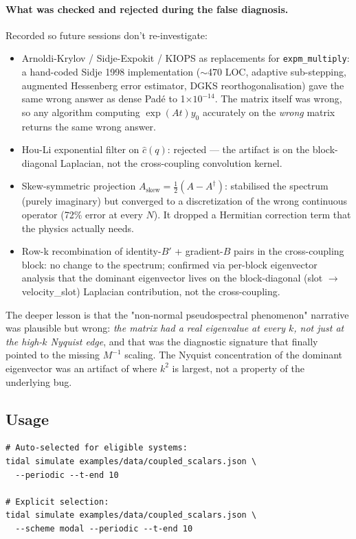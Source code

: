 \paragraph{What was checked and rejected during the false diagnosis.}
Recorded so future sessions don't re-investigate:
\begin{itemize}
  \item Arnoldi-Krylov / Sidje-Expokit / KIOPS as replacements for
    \texttt{expm\_multiply}: a hand-coded Sidje 1998 implementation
    ($\sim$470 LOC, adaptive sub-stepping, augmented Hessenberg error
    estimator, DGKS reorthogonalisation) gave the same wrong answer as
    dense Padé to 1$\times 10^{-14}$. The matrix itself was wrong,
    so any algorithm computing $\exp(A t) y_0$ accurately on the
    \emph{wrong} matrix returns the same wrong answer.
  \item Hou-Li exponential filter on $\widehat{c}(q)$: rejected — the
    artifact is on the block-diagonal Laplacian, not the
    cross-coupling convolution kernel.
  \item Skew-symmetric projection $A_{\mathrm{skew}} = \frac{1}{2}(A -
    A^\dagger)$: stabilised the spectrum (purely imaginary) but
    converged to a discretization of the wrong continuous operator
    (72\% error at every $N$). It dropped a Hermitian correction term
    that the physics actually needs.
  \item Row-k recombination of identity-$B'$ + gradient-$B$ pairs in
    the cross-coupling block: no change to the spectrum; confirmed
    via per-block eigenvector analysis that the dominant eigenvector
    lives on the block-diagonal (slot $\to$ velocity\_slot) Laplacian
    contribution, not the cross-coupling.
\end{itemize}
The deeper lesson is that the "non-normal pseudospectral phenomenon"
narrative was plausible but wrong: \emph{the matrix had a real
eigenvalue at every $k$, not just at the high-$k$ Nyquist edge}, and
that was the diagnostic signature that finally pointed to the missing
$M^{-1}$ scaling. The Nyquist concentration of the dominant
eigenvector was an artifact of where $k^2$ is largest, not a property
of the underlying bug.

\subsection{Usage}
\label{sec:modal-usage}

\begin{lstlisting}[style=bash]
# Auto-selected for eligible systems:
tidal simulate examples/data/coupled_scalars.json \
  --periodic --t-end 10

# Explicit selection:
tidal simulate examples/data/coupled_scalars.json \
  --scheme modal --periodic --t-end 10
\end{lstlisting}

